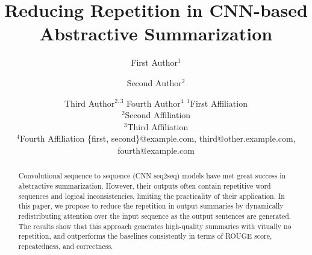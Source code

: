 \documentclass{article}
\title{Reducing Repetition in CNN-based Abstractive Summarization}
\author{
}
\author{
First Author$^1$
\and
Second Author$^2$\and
Third Author$^{2,3}$\And
Fourth Author$^4$
\affiliations
$^1$First Affiliation\\
$^2$Second Affiliation\\
$^3$Third Affiliation\\
$^4$Fourth Affiliation
\emails
\{first, second\}@example.com,
third@other.example.com,
fourth@example.com
}
\begin{document}
\maketitle

\begin{abstract}
Convolutional sequence to sequence (CNN seq2seq) models
have met great success in abstractive summarization. 
However, their outputs often contain repetitive word sequences and logical
inconsistencies, limiting the practicality of their application.
In this paper, we propose to reduce the repetition in output summaries
by dynamically redistributing attention over the input sequence as
the output sentences are generated.
The results show that this approach 
generates high-quality summaries with vitually no repetition, 
and outperforms the baselines consistently in terms of
ROUGE score, repeatedness, and correctness.
\end{abstract}










\end{document}

